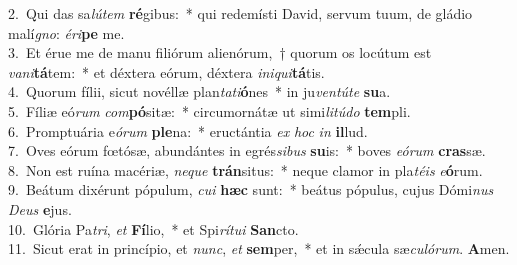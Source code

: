 {2.~}Qui das sa\textit{lú}\textit{tem} \textbf{ré}gibus:~* qui redemísti David, servum tuum, de gládio malí\textit{gno}: \textit{é}\textit{ri}\textbf{pe} me.\\
{3.~}Et érue me de manu filiórum alienórum,~† quorum os locútum est \textit{va}\textit{ni}\textbf{tá}tem:~* et déxtera eórum, déxtera \textit{i}\textit{ni}\textit{qui}\textbf{tá}tis.\\
{4.~}Quorum fílii, sicut novéllæ plan\textit{ta}\textit{ti}\textbf{ó}nes~* in ju\textit{ven}\textit{tú}\textit{te} \textbf{su}a.\\
{5.~}Fíliæ eó\textit{rum} \textit{com}\textbf{pó}sitæ:~* circumornátæ ut simi\textit{li}\textit{tú}\textit{do} \textbf{tem}pli.\\
{6.~}Promptuária e\textit{ó}\textit{rum} \textbf{ple}na:~* eructántia \textit{ex} \textit{hoc} \textit{in} \textbf{il}lud.\\
{7.~}Oves eórum fœtósæ, abundántes in egrés\textit{si}\textit{bus} \textbf{su}is:~* boves \textit{e}\textit{ó}\textit{rum} \textbf{cras}sæ.\\
{8.~}Non est ruína macériæ, \textit{ne}\textit{que} \textbf{trán}situs:~* neque clamor in pla\textit{té}\textit{is} \textit{e}\textbf{ó}rum.\\
{9.~}Beátum dixérunt pópulum, \textit{cu}\textit{i} \textbf{hæc} sunt:~* beátus pópulus, cujus Dómi\textit{nus} \textit{De}\textit{us} \textbf{e}jus.\\
{10.~}Glória Pa\textit{tri}, \textit{et} \textbf{Fí}lio,~* et Spi\textit{rí}\textit{tu}\textit{i} \textbf{San}cto.\\
{11.~}Sicut erat in princípio, et \textit{nunc}, \textit{et} \textbf{sem}per,~* et in sǽcula sæ\textit{cu}\textit{ló}\textit{rum}. \textbf{A}men.\\
